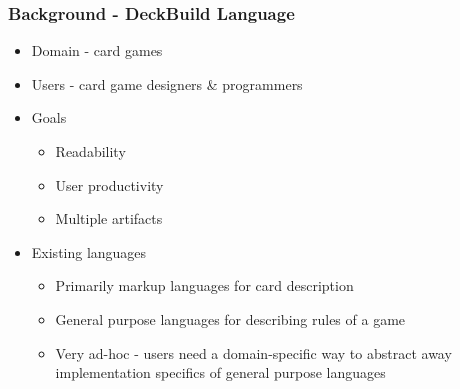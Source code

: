 
\begin{frame} \frametitle{Background - DeckBuild Language}
\begin{itemize}
\item Domain - card games
\item Users - card game designers \& programmers
\item Goals
  \begin{itemize}
  \item Readability
  \item User productivity
  \item Multiple artifacts
  \end{itemize}
\item Existing languages
  \begin{itemize}
  \item Primarily markup languages for card description
  \item General purpose languages for describing rules of a game
  \item Very ad-hoc - users need a domain-specific way to abstract
        away implementation specifics of general purpose languages
  \end{itemize}
\end{itemize}
\end{frame}




